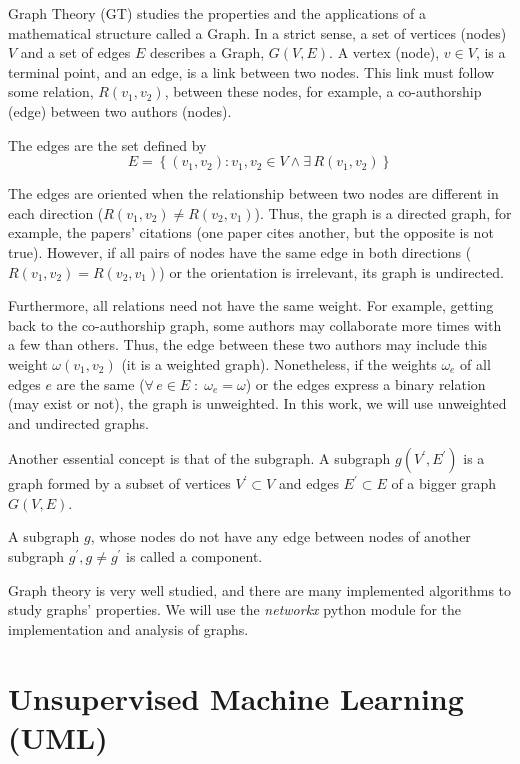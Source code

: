\documentclass[a4paper,12pt]{report}
\begin{document}
Graph Theory (GT) studies the properties and the applications of a mathematical structure called a Graph.
In a strict sense, a set of vertices (nodes) $V$ and a set of edges $E$ describes a Graph, $G(V, E)$.
A vertex (node), $v\in V$, is a terminal point, and an edge, is a link between two nodes.
This link must follow some relation, $R(v_1, v_2)$, between these nodes, for example, a co-authorship (edge) between two authors (nodes).

The edges are the set defined by
\begin{equation}
    E = \left\{(v_1, v_2) : v_1, v_2 \in V \wedge \exists\, R(v_1, v_2)\right\}
\end{equation}

The edges are oriented when the relationship between two nodes are different in each direction ($R(v_1, v_2) \neq R(v_2, v_1)$).
Thus, the graph is a directed graph, for example, the papers' citations (one paper cites another, but the opposite is not true).
However, if all pairs of nodes have the same edge in both directions ($ R(v_1, v_2) = R(v_2, v_1)$) or the orientation is irrelevant, its graph is undirected.

Furthermore, all relations need not have the same weight. For example, getting back to the co-authorship graph, some authors may collaborate more times with a few than others.
Thus, the edge between these two authors may include this weight $\omega(v_1, v_2)$ (it is a weighted graph).
Nonetheless, if the weights $\omega_e$ of all edges $e$ are the same ($\forall\, e\in E\; : \;\omega_e = \omega$) or the edges express a binary relation (may exist or not), the graph is unweighted.
In this work, we will use unweighted and undirected graphs.

Another essential concept is that of the subgraph.
A subgraph $g(V^\prime, E^\prime)$ is a graph formed by a subset of vertices $V^\prime \subset V$ and edges $E^\prime \subset E$ of a bigger graph $G(V, E)$.

A subgraph $g$, whose nodes do not have any edge between nodes of another subgraph $g^\prime, g \neq g^\prime$ is called a component.

Graph theory is very well studied, and there are many implemented algorithms to study graphs' properties.
We will use the \textit{networkx} python module for the implementation and analysis of graphs.



\section{Unsupervised Machine Learning (UML)}
\end{document}
